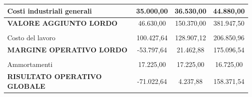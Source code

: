 \documentclass[12pt, a4paper]{article}
\begin{document}
\begin{tabular}{|lccc|}
    \multicolumn{1}{|l|}{Costi industriali generali}                                                                                 & \multicolumn{1}{c|}{35.000,00}                                    & \multicolumn{1}{c|}{36.530,00}                                    & 44.880,00            \\ \hline
    \multicolumn{1}{|l|}{\cellcolor[HTML]{CBCEFB}\textbf{VALORE AGGIUNTO LORDO}}                                                     & \multicolumn{1}{c|}{46.630,00}                                    & \multicolumn{1}{c|}{150.370,00}                                   & 381.947,50           \\ \hline
    \multicolumn{4}{|l|}{}                                                                                                                                                                                                                                                                          \\ \hline
    \multicolumn{1}{|l|}{Costo del lavoro}                                                                                           & \multicolumn{1}{c|}{100.427,64}                                   & \multicolumn{1}{c|}{128.907,12}                                   & 206.850,96           \\ \hline
    \multicolumn{1}{|l|}{\cellcolor[HTML]{CBCEFB}\textbf{MARGINE OPERATIVO LORDO}}                                                   & \multicolumn{1}{c|}{-53.797,64}                                   & \multicolumn{1}{c|}{21.462,88}                                    & 175.096,54           \\ \hline
    \multicolumn{4}{|l|}{}                                                                                                                                                                                                                                                                          \\ \hline
    \multicolumn{1}{|l|}{Ammortamenti}                                                                                               & \multicolumn{1}{c|}{17.225,00}                                    & \multicolumn{1}{c|}{17.225,00}                                    & 16.725,00            \\ \hline
    \multicolumn{1}{|l|}{\cellcolor[HTML]{CBCEFB}\textbf{RISULTATO OPERATIVO GLOBALE}}                                               & \multicolumn{1}{c|}{-71.022,64}                                   & \multicolumn{1}{c|}{4.237,88}                                     & 158.371,54           \\ \hline

\end{tabular}
\end{document}
